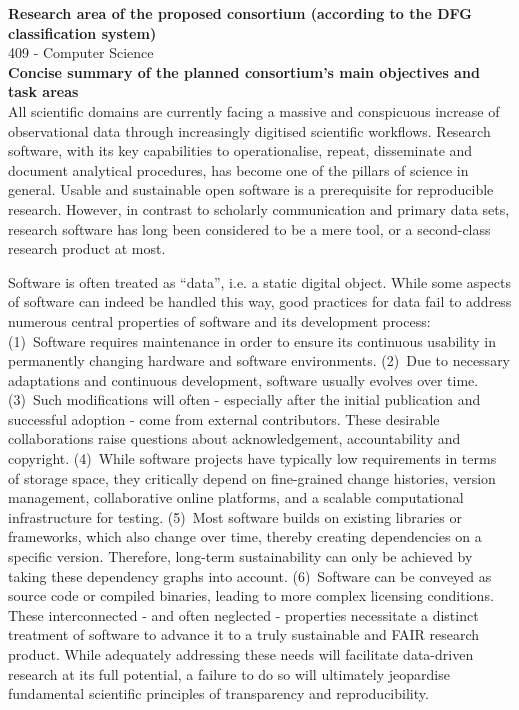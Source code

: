 \documentclass[11pt,a4paper,DIV=11]{scrlttr2}
\begin{document}
\begin{letter}{}
\textbf{Research area of the proposed consortium (according to the DFG classification system)}\\

409 - Computer Science\\

\textbf{Concise summary of the planned consortium’s main objectives and task areas}\\

All scientific domains are currently facing a massive and conspicuous increase of observational data through increasingly digitised scientific workflows. Research software, with its key capabilities to operationalise, repeat, disseminate and document analytical procedures, has become one of the pillars of science in general. Usable and  sustainable open software is a prerequisite for reproducible research. However, in contrast to scholarly communication and primary data sets, research software has long been considered to be a mere tool, or a second-class research product at most.

Software is often treated as “data”, i.e. a static digital object. While some aspects of software can indeed be handled this way, good practices for data fail to address numerous central properties of software and its development process: (1)~Software requires maintenance in order to ensure its continuous usability in permanently changing hardware and software environments. (2)~Due to necessary adaptations and continuous development, software usually evolves over time. (3)~Such modifications will often - especially after the initial publication and successful adoption - come from external contributors. These desirable collaborations raise questions about acknowledgement, accountability and copyright. (4)~While software projects have typically low requirements in terms of storage space, they critically depend on fine-grained change histories, version management, collaborative online platforms, and a scalable computational infrastructure for testing. (5)~Most software builds on existing libraries or frameworks, which also change over time, thereby creating dependencies on a specific version. Therefore, long-term sustainability can only be achieved by taking these dependency graphs into account. (6)~Software can be conveyed as source code or compiled binaries, leading to more complex licensing conditions. These interconnected - and often neglected - properties necessitate a distinct treatment of software to advance it to a truly sustainable and FAIR research product. While adequately addressing these needs will facilitate data-driven research at its full potential, a failure to do so will ultimately jeopardise fundamental scientific principles of transparency and reproducibility.


\end{letter}
\end{document}
